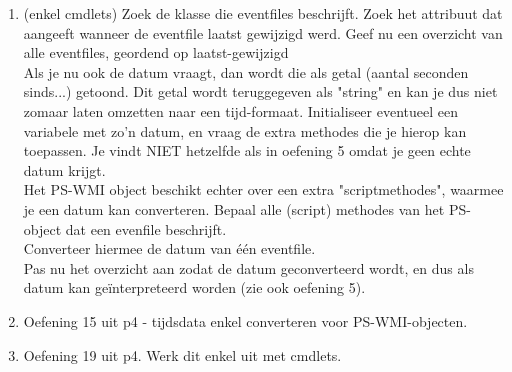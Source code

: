 \documentclass[11pt,a4paper]{report}
\begin{document}
\begin{enumerate}[resume]
	\item (enkel cmdlets) Zoek de klasse die eventfiles beschrijft. Zoek het attribuut dat aangeeft wanneer de eventfile laatst gewijzigd werd. Geef nu een overzicht van alle eventfiles, geordend op laatst-gewijzigd
	\\Als je nu ook de datum vraagt, dan wordt die als getal (aantal seconden sinds...) getoond. Dit getal wordt teruggegeven als "string" en kan je dus niet zomaar laten omzetten naar een tijd-formaat. Initialiseer eventueel een variabele met zo'n datum, en vraag de extra methodes die je hierop kan toepassen. Je vindt NIET hetzelfde als in oefening 5 omdat je geen echte datum krijgt.
	\\Het PS-WMI object beschikt echter over een extra "scriptmethodes", waarmee je een datum kan converteren. Bepaal alle (script) methodes van het PS-object dat een evenfile beschrijft.
	\\Converteer hiermee de datum van één eventfile.
	\\Pas nu het overzicht aan zodat de datum geconverteerd wordt, en dus als datum kan geïnterpreteerd worden (zie ook oefening 5).
	\item Oefening 15 uit p4 - tijdsdata enkel converteren voor PS-WMI-objecten.
	\item Oefening 19 uit p4. Werk dit enkel uit met cmdlets.
\end{enumerate}
\end{document}
